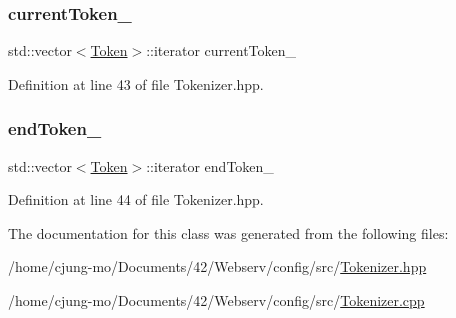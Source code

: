 \subsubsection{\texorpdfstring{current\+Token\+\_\+}{currentToken\_}}
{\footnotesize\ttfamily std\+::vector$<$\hyperlink{classft_1_1_token}{Token}$>$\+::iterator current\+Token\+\_\+\hspace{0.3cm}{\ttfamily [private]}}



Definition at line 43 of file Tokenizer.\+hpp.

\mbox{\label{classft_1_1_tokenizer_a538ba3ab8ee1d0cef5cc3c999f3ab44c}} 
\subsubsection{\texorpdfstring{end\+Token\+\_\+}{endToken\_}}
{\footnotesize\ttfamily std\+::vector$<$\hyperlink{classft_1_1_token}{Token}$>$\+::iterator end\+Token\+\_\+\hspace{0.3cm}{\ttfamily [private]}}



Definition at line 44 of file Tokenizer.\+hpp.



The documentation for this class was generated from the following files\+:\begin{DoxyCompactItemize}
\item 
/home/cjung-\/mo/\+Documents/42/\+Webserv/config/src/\hyperlink{_tokenizer_8hpp}{Tokenizer.\+hpp}\item 
/home/cjung-\/mo/\+Documents/42/\+Webserv/config/src/\hyperlink{_tokenizer_8cpp}{Tokenizer.\+cpp}\end{DoxyCompactItemize}
